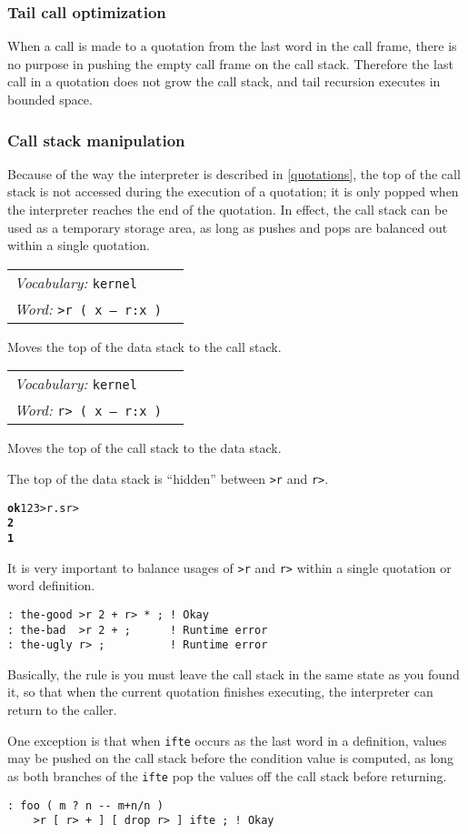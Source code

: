 \documentclass{book}
\newcommand{\vocabulary}[1]{\emph{Vocabulary:} \texttt{#1}&\\}
\newcommand{\ordinaryword}[2]{\index{\texttt{#1}}\emph{Word:} \texttt{#2}&\\}
\newcommand{\wordtable}[1]{

\begin{tabularx}{12cm}[t]{lX}
\hline
#1
\hline
\end{tabularx}

}
\begin{document}
\subsubsection{Tail call optimization}

\newcommand{\tailglos}{\glossary{
name=tail call,
description=the last call in a quotation}
\glossary{
name=tail call optimization,
description=the elimination of call stack pushes when making a tail call}}

When a call is made to a quotation from the last word in the call frame, there is no
purpose in pushing the empty call frame on the call stack. Therefore the last call in a quotation does not grow the call stack, and tail recursion executes in bounded space.

\subsubsection{Call stack manipulation}

Because of the way the interpreter is described in \ref{quotations}, the top of the call stack is not accessed during the execution of a quotation; it is only popped when the interpreter reaches the end of the quotation. In effect, the call stack can be used as a temporary storage area, as long as pushes and pops are balanced out within a single quotation.
\wordtable{
\vocabulary{kernel}
\ordinaryword{>r}{>r ( x -- r:x )}
}
Moves the top of the data stack to the call stack.
\wordtable{
\vocabulary{kernel}
\ordinaryword{r>}{r> ( x -- r:x )}
}
Moves the top of the call stack to the data stack.

The top of the data stack is ``hidden'' between \texttt{>r} and \texttt{r>}.
\begin{alltt}
\textbf{ok} 1 2 3 >r .s r>
\textbf{2
1}
\end{alltt}
It is very important to balance usages of \texttt{>r} and \texttt{r>} within a single quotation or word definition.
\begin{verbatim}
: the-good >r 2 + r> * ; ! Okay
: the-bad  >r 2 + ;      ! Runtime error
: the-ugly r> ;          ! Runtime error
\end{verbatim}
Basically, the rule is you must leave the call stack in the same state as you found it, so that when the current quotation finishes executing, the interpreter can return to the caller.

One exception is that when \texttt{ifte} occurs as the last word in a definition, values may be pushed on the call stack before the condition value is computed, as long as both branches of the \texttt{ifte} pop the values off the call stack before returning.
\begin{verbatim}
: foo ( m ? n -- m+n/n )
    >r [ r> + ] [ drop r> ] ifte ; ! Okay
\end{verbatim}
\end{document}
